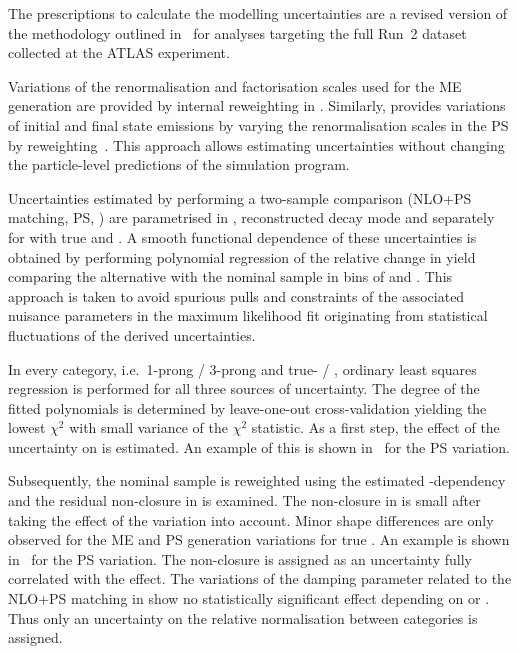 The prescriptions to calculate the \ttbar modelling uncertainties are
a revised version of the methodology outlined
in~\cite{ATL-PHYS-PUB-2020-023} for analyses targeting the full Run~2
dataset collected at the ATLAS experiment.

Variations of the renormalisation and factorisation scales used for
the ME generation are provided by internal reweighting in
\POWHEGBOX[v2]. Similarly, \PYTHIA[8] provides variations of initial
and final state emissions by varying the renormalisation scales in the
PS by reweighting~\cite{Mrenna:2016sih}. This approach allows estimating
uncertainties without changing the particle-level predictions
of the simulation program.

Uncertainties estimated by performing a two-sample comparison (NLO+PS
matching, PS, \hdamp) are parametrised in \tauhadvis \pT,
reconstructed \tauhadvis decay mode and \mTW separately for \ttbar
with true and \faketauhadvis. A smooth functional dependence of these
uncertainties is obtained by performing polynomial regression of the
relative change in yield comparing the alternative with the nominal
sample in bins of \tauhadvis \pT and \mTW. This approach is taken to
avoid spurious pulls and constraints of the associated nuisance
parameters in the maximum likelihood fit originating from statistical
fluctuations of the derived uncertainties.

In every category, i.e.\ 1-prong / 3-prong \tauhadvis and true- /
\faketauhadvis, ordinary least squares regression is performed for all
three sources of uncertainty. The degree of the fitted polynomials is
determined by leave-one-out cross-validation yielding the lowest
$\chi^2$ with small variance of the $\chi^2$ statistic. As a first
step, the effect of the uncertainty on \tauhadvis \pT is estimated. An
example of this is shown
in~
for the PS variation.

Subsequently, the nominal sample is reweighted using the estimated
\pT-dependency and the residual non-closure in \mTW is examined. The
non-closure in \mTW is small after taking the \tauhadvis \pT effect of
the variation into account. Minor shape differences are only observed
for the ME and PS generation variations for true \tauhadvis. An
example is shown
in~
for the PS variation. The non-closure is assigned as an uncertainty
fully correlated with the \pT effect. The variations of the damping
parameter related to the NLO+PS matching in \POWHEG show no
statistically significant effect depending on \tauhadvis \pT or
\mTW. Thus only an uncertainty on the relative normalisation between
categories is assigned.


